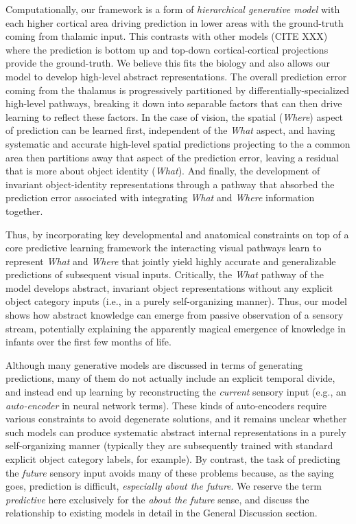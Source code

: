 \documentclass[11pt,twoside]{article}
\newif\myifpdf
\begin{document}
Computationally, our framework is a form of {\em hierarchical generative model} with each higher cortical area driving prediction in lower areas with the ground-truth coming from thalamic input. This contrasts with other models (CITE XXX) where the prediction is bottom up and top-down cortical-cortical projections provide the ground-truth. We believe this fits the biology and also allows our model to develop high-level abstract representations. The overall prediction error coming from the thalamus is progressively partitioned by differentially-specialized high-level pathways, breaking it down into separable factors that can then drive learning to reflect these factors.  In the case of vision, the spatial ({\em Where}) aspect of prediction can be learned first, independent of the {\em What} aspect, and having systematic and accurate high-level spatial predictions projecting to the a common area then partitions away that aspect of the prediction error, leaving a residual that is more about object identity ({\em What}).  And finally, the development of invariant object-identity representations through a pathway that absorbed the prediction error associated with integrating {\em What} and {\em Where} information together.

Thus, by incorporating key developmental and anatomical constraints on top of a core predictive learning framework the interacting visual pathways learn to represent {\em What}  and {\em Where} that jointly yield highly accurate and generalizable predictions of subsequent visual inputs.  Critically, the {\em What} pathway of the model develops abstract, invariant object representations without any explicit object category inputs (i.e., in a purely self-organizing manner).  Thus, our model shows how abstract knowledge can emerge from passive observation of a sensory stream, potentially explaining the apparently magical emergence of knowledge in infants over the first few months of life.

Although many generative models are discussed in terms of generating predictions, many of them do not actually include an explicit temporal divide, and instead end up learning by reconstructing the {\em current} sensory input (e.g., an {\em auto-encoder} in neural network terms).  These kinds of auto-encoders require various constraints to avoid degenerate solutions, and it remains unclear whether such models can produce systematic abstract internal representations in a purely self-organizing manner (typically they are subsequently trained with standard explicit object category labels, for example).  By contrast, the task of predicting the {\em future} sensory input avoids many of these problems because, as the saying goes, prediction is difficult, {\em especially about the future}.  We reserve the term {\em predictive} here exclusively for the {\em about the future} sense, and discuss the relationship to existing models in detail in the General Discussion section.
\end{document}
